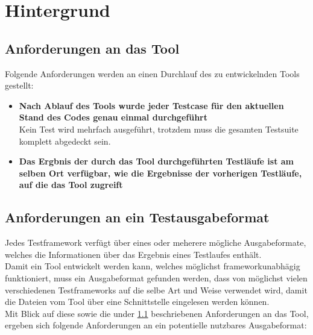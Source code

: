 \chapter{Hintergrund}\label{chap:Hintergrund}
% 
% 
\section{Anforderungen an das Tool}\label{Anforderungen Tool}
Folgende Anforderungen werden an einen Durchlauf des zu entwickelnden Tools gestellt:
\begin{itemize}
    \item \textbf{Nach Ablauf des Tools wurde jeder Testcase für den aktuellen Stand des Codes genau einmal durchgeführt}\\
    Kein Test wird mehrfach ausgeführt, trotzdem muss die gesamten Testsuite komplett abgedeckt sein.
    \item \textbf{Das Ergbnis der durch das Tool durchgeführten Testläufe ist am selben Ort verfügbar, wie die Ergebnisse der vorherigen Testläufe, auf die das Tool zugreift}
\end{itemize}

\section{Anforderungen an ein Testausgabeformat}\label{Anforderungen Testausgabeformat}
Jedes Testframework verfügt über eines oder meherere mögliche Ausgabeformate, welches die Informationen über das Ergebnis eines Testlaufes enthält.\\
Damit ein Tool entwickelt werden kann, welches möglichst frameworkunabhägig funktioniert, muss ein Ausgabeformat gefunden werden, dass von möglichst vielen verschiedenen Testframeworks auf die selbe Art und Weise verwendet wird, damit die Dateien vom Tool über eine Schnittstelle eingelesen werden können.\\
Mit Blick auf diese sowie die under \ref{Anforderungen Tool} beschriebenen Anforderungen an das Tool, ergeben sich folgende Anforderungen an ein potentielle nutzbares Ausgabeformat:

